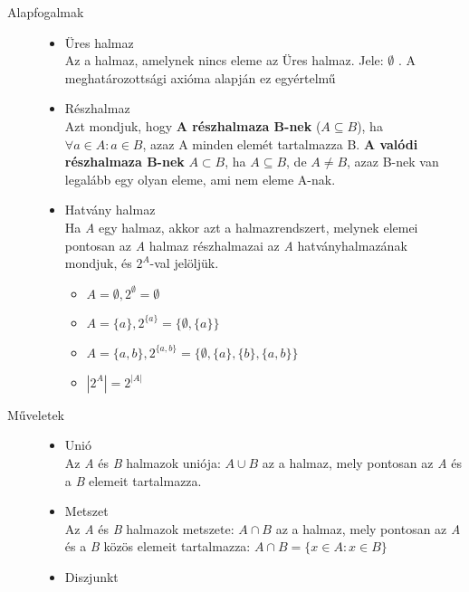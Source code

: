 \documentclass[margin=0px]{article}
\begin{document}
\begin{description}
    \item[Alapfogalmak] \hfill
        \begin{itemize}
            \item Üres halmaz \\
                  Az a halmaz, amelynek nincs eleme az Üres halmaz. Jele: $\emptyset$ . A meghatározottsági axióma alapján ez egyértelmű
            \item Részhalmaz \\
                  Azt mondjuk, hogy \textbf{A részhalmaza B-nek} ($A \subseteq B$), ha $\forall a \in A : a \in B$, azaz A minden elemét tartalmazza B.
                  \textbf{A valódi részhalmaza B-nek} \(A \subset B\), ha $A \subseteq B$, de $A \neq B$, azaz B-nek van legalább egy olyan eleme, ami nem eleme A-nak.
            \item Hatvány halmaz \\
                  Ha {\it A} egy halmaz, akkor azt a halmazrendszert, melynek elemei pontosan az {\it A} halmaz részhalmazai az {\it A} hatványhalmazának mondjuk, és $2^A$-val jelöljük.
                  \begin{itemize}
                      \item $A = \emptyset , 2^\emptyset = {\emptyset}$
                      \item $A = \{a\} , 2^{\{a\}} = \{\emptyset, \{a\}\}$
                      \item $A = \{a, b\} , 2^{\{a,b\}} = \{\emptyset, \{a\}, \{b\}, \{a, b\}\}$
                      \item $|2^A| = 2^{|A|}$
                  \end{itemize}
        \end{itemize}
    \item[Műveletek] \hfill
        \begin{itemize}
            \item Unió \\
                  Az {\it A} és {\it B} halmazok uniója: $A \cup B$ az a halmaz, mely pontosan az {\it A} és a {\it B} elemeit tartalmazza.
            \item Metszet \\
                  Az {\it A} és {\it B} halmazok metszete: $A \cap B$ az a halmaz, mely pontosan az {\it A} és a {\it B} közös elemeit tartalmazza: $A \cap B = \{ x \in A : x \in B \}$
            \item Diszjunkt \\

\end{itemize}
\end{description}
\end{document}
